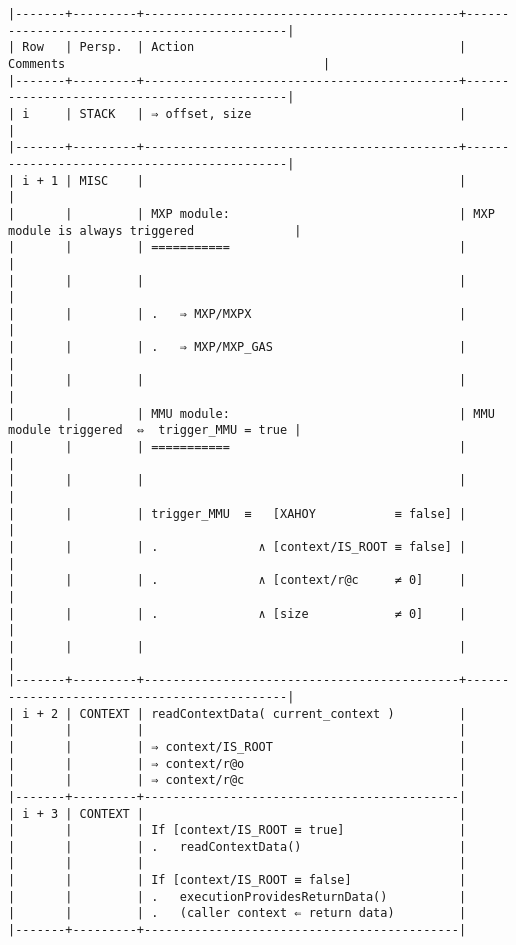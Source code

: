 \documentclass[varwidth=\maxdimen,margin=0.5cm,multi={verbatim}]{standalone}
\begin{document}
\begin{verbatim}
|-------+---------+--------------------------------------------+---------------------------------------------|
| Row   | Persp.  | Action                                     | Comments                                    |
|-------+---------+--------------------------------------------+---------------------------------------------|
| i     | STACK   | ⇒ offset, size                             |                                             |
|-------+---------+--------------------------------------------+---------------------------------------------|
| i + 1 | MISC    |                                            |                                             |
|       |         | MXP module:                                | MXP module is always triggered              |
|       |         | ===========                                |                                             |
|       |         |                                            |                                             |
|       |         | .   ⇒ MXP/MXPX                             |                                             |
|       |         | .   ⇒ MXP/MXP_GAS                          |                                             |
|       |         |                                            |                                             |
|       |         | MMU module:                                | MMU module triggered  ⇔  trigger_MMU = true |
|       |         | ===========                                |                                             |
|       |         |                                            |                                             |
|       |         | trigger_MMU  ≡   [XAHOY           ≡ false] |                                             |
|       |         | .              ∧ [context/IS_ROOT ≡ false] |                                             |
|       |         | .              ∧ [context/r@c     ≠ 0]     |                                             |
|       |         | .              ∧ [size            ≠ 0]     |                                             |
|       |         |                                            |                                             |
|-------+---------+--------------------------------------------+---------------------------------------------|
| i + 2 | CONTEXT | readContextData( current_context )         |
|       |         |                                            |
|       |         | ⇒ context/IS_ROOT                          |
|       |         | ⇒ context/r@o                              |
|       |         | ⇒ context/r@c                              |
|-------+---------+--------------------------------------------|
| i + 3 | CONTEXT |                                            |
|       |         | If [context/IS_ROOT ≡ true]                |
|       |         | .   readContextData()                      |
|       |         |                                            |
|       |         | If [context/IS_ROOT ≡ false]               |
|       |         | .   executionProvidesReturnData()          |
|       |         | .   (caller context ⇐ return data)         |
|-------+---------+--------------------------------------------|

\end{verbatim}
\end{document}
